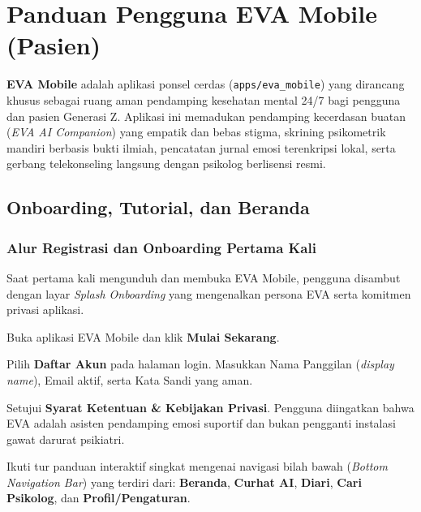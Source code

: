 \chapter{Panduan Pengguna EVA Mobile (Pasien)}
\label{chap:eva-mobile}

\textbf{EVA Mobile} adalah aplikasi ponsel cerdas (\texttt{apps/eva\_mobile}) yang dirancang khusus sebagai ruang aman pendamping kesehatan mental 24/7 bagi pengguna dan pasien Generasi Z. Aplikasi ini memadukan pendamping kecerdasan buatan (\textit{EVA AI Companion}) yang empatik dan bebas stigma, skrining psikometrik mandiri berbasis bukti ilmiah, pencatatan jurnal emosi terenkripsi lokal, serta gerbang telekonseling langsung dengan psikolog berlisensi resmi.

\section{Onboarding, Tutorial, dan Beranda}

\subsection{Alur Registrasi dan Onboarding Pertama Kali}
Saat pertama kali mengunduh dan membuka EVA Mobile, pengguna disambut dengan layar \textit{Splash Onboarding} yang mengenalkan persona EVA serta komitmen privasi aplikasi.

\begin{steplist}
  \item Buka aplikasi EVA Mobile dan klik \textbf{Mulai Sekarang}.
  \item Pilih \textbf{Daftar Akun} pada halaman login. Masukkan Nama Panggilan (\textit{display name}), Email aktif, serta Kata Sandi yang aman.
  \item Setujui \textbf{Syarat Ketentuan \& Kebijakan Privasi}. Pengguna diingatkan bahwa EVA adalah asisten pendamping emosi suportif dan bukan pengganti instalasi gawat darurat psikiatri.
  \item Ikuti tur panduan interaktif singkat mengenai navigasi bilah bawah (\textit{Bottom Navigation Bar}) yang terdiri dari: \textbf{Beranda}, \textbf{Curhat AI}, \textbf{Diari}, \textbf{Cari Psikolog}, dan \textbf{Profil/Pengaturan}.
\end{steplist}


